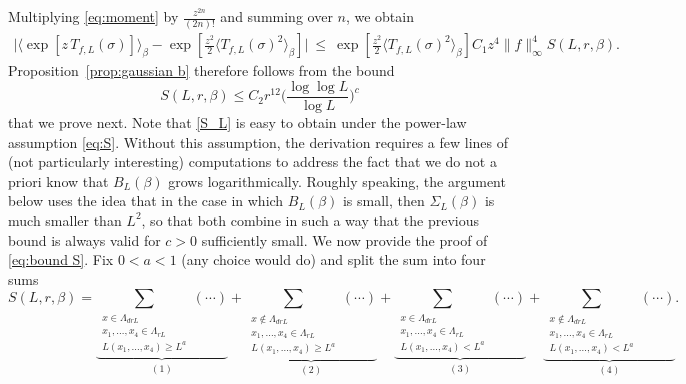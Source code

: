 \documentclass[a4paper,oneside,11pt]{article}
\newcommand{\be}[1]{\begin{equation}\label{#1}}
\newcommand{\ee}{\end{equation}}
\numberwithin{equation}{section}
\numberwithin{equation}{section}
\numberwithin{equation}{section}
\def\be{\begin{equation}}
\def\ee{\end{equation}}
\begin{document}
Multiplying \eqref{eq:moment} by $\tfrac{z^{2n}}{(2n)!}$ and summing over $n$, we obtain
\begin{align}\label{S_L}
 \Big|\langle \exp[z\,T_{f,L}(\sigma)]\rangle_\beta- \exp[\tfrac{z^2}2\langle T_{f,L}(\sigma)^2\rangle_\beta]\Big|~\le~ \exp[\tfrac{z^2}2\langle T_{f,L}(\sigma)^2\rangle_\beta] C_1z^4\|f\|_\infty^4 S(L,r,\beta).\end{align}
Proposition~\ref{prop:gaussian b} therefore
follows from the bound
\be\label{eq:bound S}
S(L,r,\beta)\le C_2r^{12}\Big(\frac{\log \log L}{\log L}\Big)^c
\ee
that we prove next. 
Note that \eqref{S_L} is easy to obtain under the power-law assumption \eqref{eq:S}. Without this assumption, the derivation requires  a few lines of (not particularly interesting) computations to address  the fact that we do not a priori know that $B_L(\beta)$ grows logarithmically. Roughly speaking, the argument below uses the idea that in the case in which $B_L(\beta)$ is small, then $\Sigma_L(\beta)$ is much smaller than $L^2$, so that both combine in such a way that the previous bound is always valid for $c>0$ sufficiently small. 
We now provide the proof of \eqref{eq:bound S}.  Fix $0<a<1$ (any choice would do) and split the sum into four sums
\begin{equation}
S(L,r,\beta)=\underbrace{\sum_{\substack{x\in \Lambda_{drL}\\ x_1,\dots,x_4\in\Lambda_{rL}\\ L(x_1,\dots,x_4)\ge L^a}}(\cdots)}_{(1)}+\underbrace{\sum_{\substack{x\notin \Lambda_{drL}\\ x_1,\dots,x_4\in\Lambda_{rL}\\ L(x_1,\dots,x_4)\ge L^a}}(\cdots)}_{(2)}+\underbrace{\sum_{\substack{x\in \Lambda_{drL}\\ x_1,\dots,x_4\in\Lambda_{rL}\\ L(x_1,\dots,x_4)< L^a}}(\cdots)}_{(3)}+\underbrace{\sum_{\substack{x\notin \Lambda_{drL}\\ x_1,\dots,x_4\in\Lambda_{rL}\\ L(x_1,\dots,x_4)< L^a}}(\cdots)}_{(4)}.
\end{equation}
\end{document}
